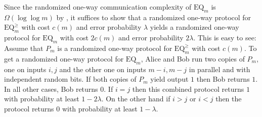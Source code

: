 \documentclass{theoretics}
\renewcommand{\geq}{\geqslant}
\begin{document}
Since the randomized one-way communication complexity of $\mathrm{EQ}_m$ is $\Omega(\log \log m)$ by , it suffices to 
show that a randomized one-way protocol for $\mathrm{EQ}^{\geq}_m$ with cost $c(m)$ and error probability $\lambda$ yields a 
randomized one-way protocol for $\mathrm{EQ}_m$ with cost $2 c(m)$ and error probability $2\lambda$. This is easy to see: Assume that 
$P_m$ is a randomized one-way protocol for $\mathrm{EQ}^{\geq}_m$ with cost $c(m)$. To get a 
randomized one-way protocol for $\mathrm{EQ}_m$, Alice and Bob run two copies of $P_m$, one on inputs $i,j$ and the other one on inputs
$m-i, m-j$ in parallel and with independent random bits.
If both copies of $P_m$ yield output $1$ then Bob returns $1$. In all other cases, Bob returns $0$.
If $i=j$ then this combined protocol returns $1$ with probability at least $1-2\lambda$.
On the other hand if $i > j$ or $i < j$ then the protocol returns $0$ with probability at least $1-\lambda$.
\end{document}
